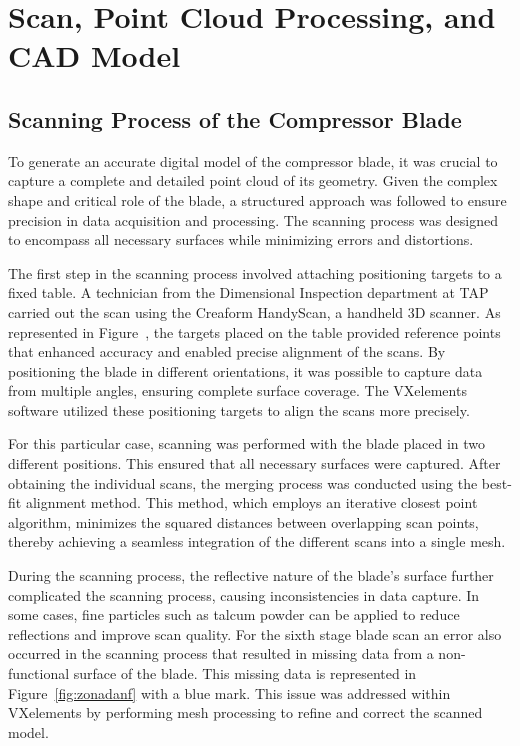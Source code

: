 
%


\chapter{Scan, Point Cloud Processing, and CAD Model}
\label{cha:digi}


\section{Scanning Process of the Compressor Blade}
\label{sec:scan}

To generate an accurate digital model of the compressor blade, it was crucial to capture a complete and detailed point cloud of its geometry. Given the complex shape and critical role of the blade, a structured approach was followed to ensure precision in data acquisition and processing. The scanning process was designed to encompass all necessary surfaces while minimizing errors and distortions.

The first step in the scanning process involved attaching positioning targets to a fixed table. A technician from the Dimensional Inspection department at \gls{TAP} carried out the scan using the Creaform HandyScan, a handheld 3D scanner. As represented in Figure~, the targets placed on the table provided reference points that enhanced accuracy and enabled precise alignment of the scans. By positioning the blade in different orientations, it was possible to capture data from multiple angles, ensuring complete surface coverage. The VXelements software utilized these positioning targets to align the scans more precisely.

For this particular case, scanning was performed with the blade placed in two different positions. This ensured that all necessary surfaces were captured. After obtaining the individual scans, the merging process was conducted using the best-fit alignment method. This method, which employs an iterative closest point algorithm, minimizes the squared distances between overlapping scan points, thereby achieving a seamless integration of the different scans into a single mesh.

During the scanning process, the reflective nature of the blade’s surface further complicated the scanning process, causing inconsistencies in data capture. In some cases, fine particles such as talcum powder can be applied to reduce reflections and improve scan quality. For the sixth stage blade scan an error also occurred in the scanning process that resulted in missing data from a non-functional surface of the blade. This missing data is represented in Figure~\ref{fig:zonadanf} with a blue mark. This issue was addressed within VXelements by performing mesh processing to refine and correct the scanned model.

